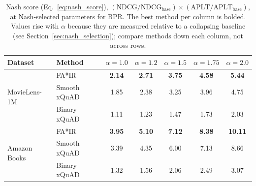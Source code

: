 \begin{table}[htbp]
\centering
\caption{Nash score (Eq.~\ref{eq:nash_score}), $(\mathrm{NDCG}/\mathrm{NDCG}_{\mathrm{base}})\times(\mathrm{APLT}/\mathrm{APLT}_{\mathrm{base}})$, at Nash-selected parameters for BPR. The best method per column is bolded. Values rise with $\alpha$ because they are measured relative to a collapsing baseline (see Section~\ref{sec:nash_selection}); compare methods down each column, not across rows.}
\label{tab:pareto_nash}
\begin{tabular}{llccccc}
\toprule
Dataset & Method & $\alpha=1.0$ & $\alpha=1.2$ & $\alpha=1.5$ & $\alpha=1.75$ & $\alpha=2.0$ \\
\midrule
\multirow{3}{*}{MovieLens-1M} & FA*IR & \textbf{2.14} & \textbf{2.71} & \textbf{3.75} & \textbf{4.58} & \textbf{5.44} \\
\rowcolor{gray!6}  & Smooth xQuAD & 1.85 & 2.38 & 3.25 & 3.96 & 4.75 \\
 & Binary xQuAD & 1.11 & 1.23 & 1.47 & 1.73 & 2.03 \\
\midrule
\multirow{3}{*}{Amazon Books} & FA*IR & \textbf{3.95} & \textbf{5.10} & \textbf{7.12} & \textbf{8.38} & \textbf{10.11} \\
\rowcolor{gray!6}  & Smooth xQuAD & 3.39 & 4.35 & 6.00 & 7.13 & 8.66 \\
 & Binary xQuAD & 1.32 & 1.56 & 2.06 & 2.49 & 3.07 \\
\bottomrule
\end{tabular}
\end{table}